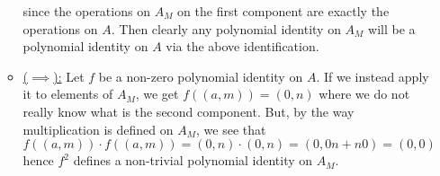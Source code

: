 \documentclass[a4paper, 12pt]{article}
\begin{document}
\begin{Exercise}
\begin{enumerate}[label=(\alph*)]
\begin{itemize}
                    since the operations on $A_M$ on the first component are exactly the operations on $A$.
                    Then clearly any polynomial identity on $A_M$ will be a polynomial identity on $A$ via the above identification.
                \item \underline{($\implies$):}
                    Let $f$ be a non-zero polynomial identity on $A$.
                    If we instead apply it to elements of $A_M$, we get $f((a, m)) = (0, n)$ where we do not really know what is the second component.
                    But, by the way multiplication is defined on $A_M$, we see that
                    \[
                        f((a, m)) \cdot f((a, m)) = (0, n) \cdot (0, n) = (0, 0n + n0) = (0, 0)
                    \]
                    hence $f^2$ defines a non-trivial polynomial identity on $A_M$.
            \end{itemize}
    \end{enumerate}
\end{Exercise}
\end{document}
